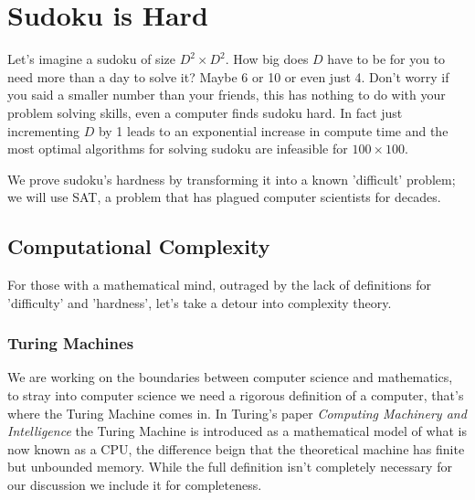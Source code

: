 \documentclass[a4paper,11pt]{report}
\begin{document}



\chapter{Sudoku is Hard}

Let's imagine a sudoku of size $D^2\times D^2$. How big does $D$ have to be for you to need more than a day to solve it? Maybe 6 or 10 or even just 4. Don't worry if you said a smaller number than your friends, this has nothing to do with your problem solving skills, even a computer finds sudoku hard. In fact just incrementing $D$ by 1 leads to an exponential increase in compute time and the most optimal algorithms for solving sudoku are infeasible for $100 \times 100$.

We prove sudoku's hardness by transforming it into a known 'difficult' problem; we will use SAT, a problem that has plagued computer scientists for decades.

\section{Computational Complexity}

For those with a mathematical mind, outraged by the lack of definitions for 'difficulty' and 'hardness', let's take a detour into complexity theory.

\subsection{Turing Machines}

We are working on the boundaries between computer science and mathematics, to stray into computer science we need a rigorous definition of a computer, that's where the Turing Machine comes in. In Turing's paper \textit{Computing Machinery and Intelligence} \cite{turing} the Turing Machine is introduced as a mathematical model of what is now known as a CPU, the difference beign that the theoretical machine has finite but unbounded memory. While the full definition isn't completely necessary for our discussion we include it for completeness.
\end{document}
